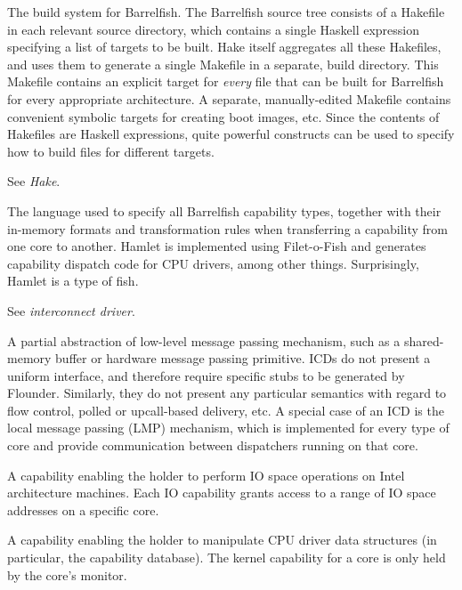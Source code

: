 \item[Hake \textrm{\textit{(Hakefile)}}:] The build system for Barrelfish.  The Barrelfish source tree consists of a Hakefile in each relevant source directory, which contains a single Haskell expression specifying a list of targets to be built.  Hake itself aggregates all these Hakefiles, and uses them to generate a single Makefile in a separate, build directory.  This Makefile contains an explicit target for \emph{every} file that can be built for Barrelfish for every appropriate architecture.  A separate, manually-edited Makefile contains convenient symbolic targets for creating boot images, etc.  Since the contents of Hakefiles are Haskell expressions, quite powerful constructs can be used to specify how to build files for different targets.

\item[Hakefile:] See \textit{Hake}.

\item[Hamlet:] The language used to specify all Barrelfish capability types, together with their in-memory formats and transformation rules when transferring a capability from one core to another.  Hamlet is implemented using Filet-o-Fish and generates capability dispatch code for CPU drivers, among other things. Surprisingly, Hamlet is a type of fish.

\item[ICD:] See \textit{interconnect driver}.

\item[interconnect driver \textrm{\textit{(ICD)}}:] A partial abstraction of low-level message passing mechanism, such as a shared-memory buffer or hardware message passing primitive.  ICDs do not present a uniform interface, and therefore require specific stubs to be generated by Flounder.  Similarly, they do not present any particular semantics with regard to flow control, polled or upcall-based delivery, etc.  A special case of an ICD is the local message passing (LMP) mechanism, which is implemented for every type of core and provide communication between dispatchers running on that core.

\item[IO capability:] A capability enabling the holder to perform IO space operations on Intel architecture machines.  Each IO capability grants access to a range of IO space addresses on a specific core.

\item[kernel capability:] A capability enabling the holder to manipulate CPU driver data structures (in particular, the capability database).  The kernel capability for a core is only held by the core's monitor.

